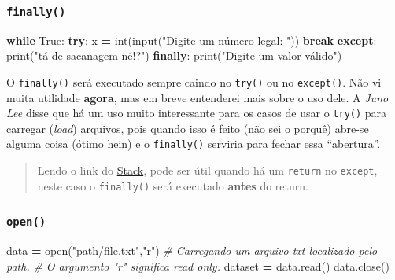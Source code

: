 \documentclass[]{book}
\newenvironment{Shaded}{\begin{snugshade}}{\end{snugshade}}
\newcommand{\StringTok}[1]{\textcolor[rgb]{0.31,0.60,0.02}{#1}}
\newcommand{\CommentTok}[1]{\textcolor[rgb]{0.56,0.35,0.01}{\textit{#1}}}
\newcommand{\VariableTok}[1]{\textcolor[rgb]{0.00,0.00,0.00}{#1}}
\newcommand{\ControlFlowTok}[1]{\textcolor[rgb]{0.13,0.29,0.53}{\textbf{#1}}}
\newcommand{\OperatorTok}[1]{\textcolor[rgb]{0.81,0.36,0.00}{\textbf{#1}}}
\newcommand{\BuiltInTok}[1]{#1}
\newcommand{\NormalTok}[1]{#1}
\begin{document}
\subsubsection{\texorpdfstring{\texttt{finally()}}{finally()}}\label{finally}

\begin{Shaded}
\begin{Highlighting}[]
\ControlFlowTok{while} \VariableTok{True}\NormalTok{:}
    \ControlFlowTok{try}\NormalTok{:}
\NormalTok{        x }\OperatorTok{=} \BuiltInTok{int}\NormalTok{(}\BuiltInTok{input}\NormalTok{(}\StringTok{"Digite um número legal: "}\NormalTok{))}
        \ControlFlowTok{break}
    \ControlFlowTok{except}\NormalTok{:}
        \BuiltInTok{print}\NormalTok{(}\StringTok{"tá de sacanagem né!?"}\NormalTok{)}
    \ControlFlowTok{finally}\NormalTok{:}
        \BuiltInTok{print}\NormalTok{(}\StringTok{"Digite um valor válido"}\NormalTok{)}
\end{Highlighting}
\end{Shaded}

O \texttt{finally()} será executado sempre caindo no \texttt{try()} ou
no \texttt{except()}. Não vi muita utilidade \textbf{agora}, mas em
breve entenderei mais sobre o uso dele. A \emph{Juno Lee} disse que há
um uso muito interessante para os casos de usar o \texttt{try()} para
carregar (\emph{load}) arquivos, pois quando isso é feito (não sei o
porquê) abre-se alguma coisa (ótimo hein) e o \texttt{finally()}
serviria para fechar essa ``abertura''.

\begin{quote}
Lendo o link do
\href{https://stackoverflow.com/questions/11551996/why-do-we-need-the-finally-clause-in-python}{Stack},
pode ser útil quando há um \texttt{return} no \texttt{except}, neste
caso o \texttt{finally()} será executado \textbf{antes} do return.
\end{quote}

\subsubsection{\texorpdfstring{\texttt{open()}}{open()}}\label{open}

\begin{Shaded}
\begin{Highlighting}[]
\NormalTok{data }\OperatorTok{=} \BuiltInTok{open}\NormalTok{(}\StringTok{"path/file.txt"}\NormalTok{,}\StringTok{"r"}\NormalTok{)  }\CommentTok{# Carregando um arquivo txt localizado pelo path.}
                                  \CommentTok{# O argumento "r" significa read only.}
\NormalTok{dataset }\OperatorTok{=}\NormalTok{ data.read()}
\NormalTok{data.close()}
\end{Highlighting}
\end{Shaded}
\end{document}
